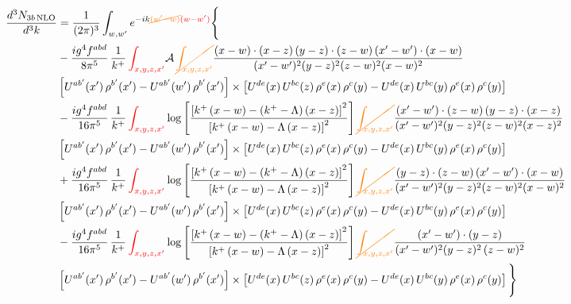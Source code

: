 \documentclass[9pt]{article}
\numberwithin{equation}{section}
\begin{document}
\begin{align}
\frac{d^{3}N_{3b\,\rm NLO}}{d^{3}k} & =\frac{1}{(2\pi)^{3}}\int_{w,w'}e^{-ik{\color{orange}\cancel{(w'-w)}}{\color{red}(w-w')}}\Bigg\{\notag \\ &-\frac{ig^{4}f^{abd}}{8\pi^{5}}\,\frac{1}{k^{+}}\,{\color{red}\int_{x,y,z,x'}}\mathcal{A}\,{\color{orange}\cancel{\int_{x,y,z,x'}}}
\frac{(x-w)\cdot(x-z)\,(y-z)\cdot(z-w)\,(x'-w')\cdot(x-w)}{(x'-w')^{2}(y-z)^{2}(z-w)^{2}(x-w)^{2}}\notag \\ & \left[U^{ab'}(x')\,\rho^{b'}(x')-U^{ab'}(w')\, \rho^{b'}(x')\right]\times \left[U^{de}(x)\,U^{bc}(z)\, \rho^{e}(x)\,\rho^{c}(y)-U^{de}(x)\,U^{bc}(y)\,\rho^{e}(x)\,\rho^{c}(y)\right]\notag \\ & -\frac{ig^{4}f^{abd}}{16\pi^{5}}\,\frac{1}{k^{+}}\,{\color{red}\int_{x,y,z,x'}}\log{\left[\frac{\left[k^{+}\,(x-w)-(k^{+}-\Lambda)\,(x-z)\right]^{2}}{\left[k^{+}\,(x-w)-\Lambda\,(x-z)\right]^{2}}\right]}\,{\color{orange}\cancel{\int_{x,y,z,x'}}}
\frac{(x'-w')\cdot(z-w)\,(y-z)\cdot(x-z)}{(x'-w')^{2}(y-z)^{2}(z-w)^{2}(x-z)^{2}}\notag \\
&\left[U^{ab'}(x')\,\rho^{b'}(x')-U^{ab'}(w')\, \rho^{b'}(x')\right]\times \left[U^{de}(x)\,U^{bc}(z)\, \rho^{e}(x)\,\rho^{c}(y)-U^{de}(x)\,U^{bc}(y)\,\rho^{e}(x)\,\rho^{c}(y)\right]\notag \\ &+ \frac{ig^{4}f^{abd}}{16\pi^{5}}\,\frac{1}{k^{+}}\,{\color{red}\int_{x,y,z,x'}}\log{\left[\frac{\left[k^{+}\,(x-w)-(k^{+}-\Lambda)\,(x-z)\right]^{2}}{\left[k^{+}\,(x-w)-\Lambda\,(x-z)\right]^{2}}\right]}\,{\color{orange}\cancel{\int_{x,y,z,x'}}}
\frac{(y-z)\cdot(z-w)\,(x'-w')\cdot(x-w)}{(x'-w')^{2}(y-z)^{2}(z-w)^{2}(x-w)^{2}}\notag \\ 
& \left[U^{ab'}(x')\,\rho^{b'}(x')-U^{ab'}(w')\, \rho^{b'}(x')\right]\times \left[U^{de}(x)\,U^{bc}(z)\, \rho^{e}(x)\,\rho^{c}(y)-U^{de}(x)\,U^{bc}(y)\,\rho^{e}(x)\,\rho^{c}(y)\right]\notag \\ & -\frac{ig^{4}f^{abd}}{16\pi^{5}}\,\frac{1}{k^{+}}\,{\color{red}\int_{x,y,z,x'}}\log{\left[\frac{\left[k^{+}\,(x-w)-(k^{+}-\Lambda)\,(x-z)\right]^{2}}{\left[k^{+}\,(x-w)-\Lambda\,(x-z)\right]^{2}}\right]}\,{\color{orange}\cancel{\int_{x,y,z,x'}}}
\frac{(x'-w')\cdot(y-z)}{(x'-w')^{2}(y-z)^{2}\,(z-w)^{2}}\notag \\ & \left[U^{ab'}(x')\,\rho^{b'}(x')-U^{ab'}(w')\, \rho^{b'}(x')\right]\times \left[U^{de}(x)\,U^{bc}(z)\, \rho^{e}(x)\,\rho^{c}(y)-U^{de}(x)\,U^{bc}(y)\,\rho^{e}(x)\,\rho^{c}(y)\right]\Bigg\}
\end{align}
\end{document}
